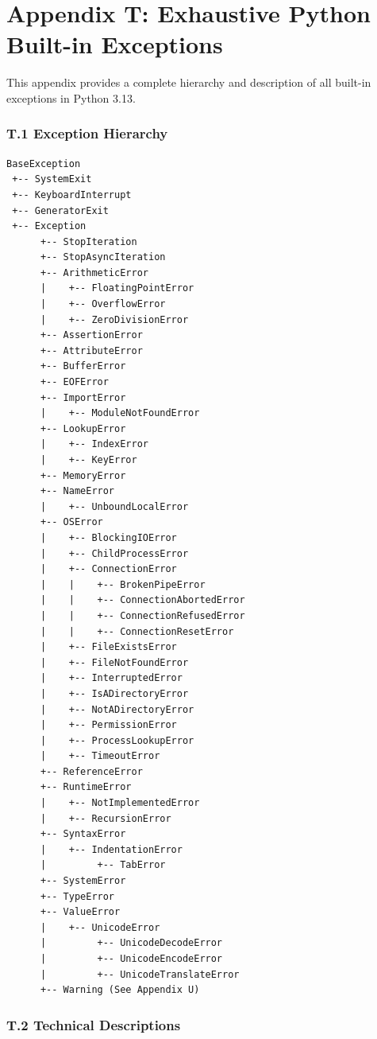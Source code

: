 \hypertarget{appendix-t-exhaustive-python-built-in-exceptions}{%
\chapter{Appendix T: Exhaustive Python Built-in
Exceptions}\label{appendix-t-exhaustive-python-built-in-exceptions}}

This appendix provides a complete hierarchy and description of all
built-in exceptions in Python 3.13.

\hypertarget{t.1-exception-hierarchy}{%
\subsection{T.1 Exception Hierarchy}\label{t.1-exception-hierarchy}}

\begin{lstlisting}
BaseException
 +-- SystemExit
 +-- KeyboardInterrupt
 +-- GeneratorExit
 +-- Exception
      +-- StopIteration
      +-- StopAsyncIteration
      +-- ArithmeticError
      |    +-- FloatingPointError
      |    +-- OverflowError
      |    +-- ZeroDivisionError
      +-- AssertionError
      +-- AttributeError
      +-- BufferError
      +-- EOFError
      +-- ImportError
      |    +-- ModuleNotFoundError
      +-- LookupError
      |    +-- IndexError
      |    +-- KeyError
      +-- MemoryError
      +-- NameError
      |    +-- UnboundLocalError
      +-- OSError
      |    +-- BlockingIOError
      |    +-- ChildProcessError
      |    +-- ConnectionError
      |    |    +-- BrokenPipeError
      |    |    +-- ConnectionAbortedError
      |    |    +-- ConnectionRefusedError
      |    |    +-- ConnectionResetError
      |    +-- FileExistsError
      |    +-- FileNotFoundError
      |    +-- InterruptedError
      |    +-- IsADirectoryError
      |    +-- NotADirectoryError
      |    +-- PermissionError
      |    +-- ProcessLookupError
      |    +-- TimeoutError
      +-- ReferenceError
      +-- RuntimeError
      |    +-- NotImplementedError
      |    +-- RecursionError
      +-- SyntaxError
      |    +-- IndentationError
      |         +-- TabError
      +-- SystemError
      +-- TypeError
      +-- ValueError
      |    +-- UnicodeError
      |         +-- UnicodeDecodeError
      |         +-- UnicodeEncodeError
      |         +-- UnicodeTranslateError
      +-- Warning (See Appendix U)
\end{lstlisting}

\hypertarget{t.2-technical-descriptions}{%
\subsection{T.2 Technical
Descriptions}\label{t.2-technical-descriptions}}

